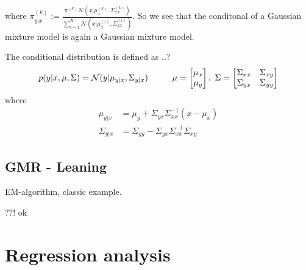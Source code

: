 where $\pi_{y|x}^{(k)} := \frac{\pi^{(k)} \mathcal{N}(x|\mu_{x}^{(k)},\Sigma_{xx}^{(k)})}
{\sum_{i=1}^K \mathcal{N}(x|\mu_{x}^{(i)},\Sigma_{xx}^{(i)})}$. So we see that 
the conditonal of a Gaussian mixture model is again a Gaussian mixture model.


\begin{testexample2}
    The conditional distribution is defined as \cite{bishop} ..?
    $$p(y|x,\mu, \Sigma) = \mathcal{N}(y|\mu_{y|x},\Sigma_{y|x} )\hspace{1cm} \mu=\begin{bmatrix}
        \mu_x \\ \mu_y
    \end{bmatrix},\hspace{0.1cm} \Sigma = \begin{bmatrix}
        \Sigma_{xx} & \Sigma_{xy}\\ \Sigma_{yx}& \Sigma_{yy}
    \end{bmatrix}$$ 
    where 
    \begin{align}
        \mu_{y|x} &= \mu_y+\Sigma_{yx}\Sigma_{xx}^{-1}(x-\mu_x)\\
        \Sigma_{y|x} &= \Sigma_{yy}-\Sigma_{yx}\Sigma_{xx}^{-1}\Sigma_{xy} 
    \end{align}
    
\end{testexample2}


\subsection{GMR - Leaning}

EM-algorithm, classic example. 



\begin{testexample2}[Crossvalidation]
??! ok
\end{testexample2}

\section{Regression analysis}